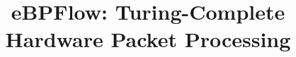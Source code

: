 \documentclass[pageno]{jpaper}
\begin{document}
\title{
eBPFlow: Turing-Complete Hardware Packet Processing}

\date{}
\maketitle

\thispagestyle{empty}








%



\balance


\end{document}
